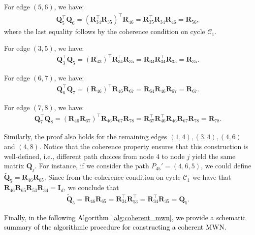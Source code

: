 \documentclass[aps,showpacs,preprintnumbers,amsmath,amssymb,twocolumn,superscriptaddress,floatfix,nofootinbib,10pt,pre]{revtex4-1}
\begin{document}
For edge $(5,6)$, we have:
\begin{align}
    \mathbf Q_5^\top\mathbf Q_6 = (\mathbf{R}_{34}^\top \mathbf{R}_{35})^\top\mathbf{R}_{46} = \mathbf{R}_{35}^\top\mathbf{R}_{34}\mathbf{R}_{46} = \mathbf R_{56},
\end{align}
where the last equality follows by the coherence condition on cycle $\mathcal C_1$.

For edge $(3,5)$, we have:
\begin{align}
    \mathbf Q_3^\top\mathbf Q_5 = (\mathbf{R}_{43})^\top\mathbf{R}_{34}^\top \mathbf{R}_{35} = \mathbf R_{34}\mathbf{R}_{34}^\top \mathbf{R}_{35} = \mathbf R_{35}.
\end{align}

For edge $(6,7)$, we have:
\begin{align}
    \mathbf Q_6^\top\mathbf Q_7 = (\mathbf{R}_{46})^\top\mathbf{R}_{46} \mathbf{R}_{67} = \mathbf R_{64}\mathbf{R}_{46}\mathbf{R}_{67} = \mathbf{R}_{67}.
\end{align}

For edge $(7,8)$, we have:
\begin{align}
    \mathbf Q_7^\top\mathbf Q_8 = (\mathbf{R}_{46} \mathbf{R}_{67})^\top\mathbf{R}_{46} \mathbf{R}_{67} \mathbf{R}_{78} = \mathbf{R}_{67}^\top\mathbf{R}_{46}^\top\mathbf{R}_{46} \mathbf{R}_{67} \mathbf{R}_{78}=\mathbf{R}_{78}.
\end{align}

Similarly, the proof also holds for the remaining edges $(1,4), (3,4), (4,6)$ and $(4,8)$. Notice that the coherence property ensures that this construction is 
well-defined, i.e., different path choices from node 4 to node $j$ yield 
the same matrix $\mathbf{Q}_j$. For instance, if we consider the path $P_{45}'=(4,6,5)$, we could define $\tilde{\mathbf Q}_5=\mathbf R_{46}\mathbf R_{65}$. Since from the coherence condition on cycle $\mathcal C_1$ we have that $\mathbf R_{46}\mathbf R_{65}\mathbf R_{53}\mathbf R_{34}=\mathbf I_d$, we conclude that
\begin{align}
    \tilde{\mathbf Q}_5 = \mathbf R_{46}\mathbf R_{65} = \mathbf R_{34}^\top\mathbf R_{53}^\top = \mathbf R_{34}^\top\mathbf R_{35} = \mathbf Q_5.
\end{align}

\textcolor{black}{Finally, in the following Algorithm~\ref{alg:coherent_mwn}, we provide a schematic summary of the algorithmic procedure for constructing a coherent MWN.}
\end{document}
